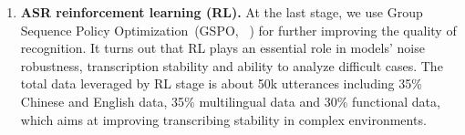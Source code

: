 \begin{enumerate}[label=(\arabic*)]
\begin{CJK*}{UTF8}{gkai}
{\begin{tcolorbox}
    \textbf{Output style 2: For no speech detected}\\
    \textbf{<|im\_start|>}assistant \\
    language None\textbf{<asr\_text><|im\_end|>}
    \end{tcolorbox}
    }
    \end{CJK*}
    Meanwhile, the model learns to utilize the context tokens inside the system prompt as background knowledge, allowing users to obtain customized ASR results.
    

    

    \item \textbf{ASR reinforcement learning (RL).} At the last stage, we use Group Sequence Policy Optimization~(GSPO, ~\cite{zheng2025group}) for further improving the quality of recognition. It turns out that RL plays an essential role in models' noise robustness, transcription stability and ability to analyze difficult cases. The total data leveraged by RL stage is about 50k utterances including 35\% Chinese and English data, 35\% multilingual data and 30\% functional data, which aims at improving transcribing stability in complex environments.
\end{enumerate}

